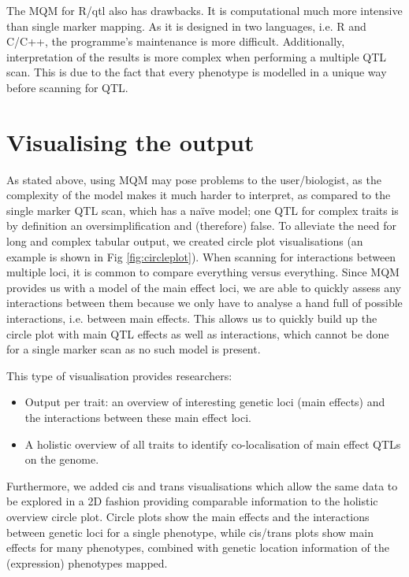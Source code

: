 The MQM for R/qtl also has drawbacks. It is computational much more intensive than single marker mapping. As it is designed in two languages, i.e. 
R and C/C++, the programme's maintenance is more difficult. Additionally, interpretation of the results is more complex when performing a multiple 
QTL scan. This is due to the fact that every phenotype is modelled in a unique way before scanning for QTL. 

\section{Visualising the output}
As stated above, using MQM may pose problems to the user/biologist, as the complexity of the model makes it much harder to interpret, as compared to 
the single marker QTL scan, which has a na\"ive model; one QTL for complex traits is by definition an oversimplification and (therefore) false. To 
alleviate the need for long and complex tabular output, we created circle plot visualisations (an example is shown in Fig \ref{fig:circleplot}). When 
scanning for interactions between multiple loci, it is common to compare everything versus everything. Since MQM provides us with a model of the main 
effect loci, we are able to quickly assess any interactions between them because we only have to analyse a hand full of possible interactions, i.e. 
between main effects. This allows us to quickly build up the circle plot with main QTL effects as well as interactions, which cannot be done for a 
single marker scan as no such model is present. 

This type of visualisation provides researchers:

\begin{itemize}\itemsep1pt
\item Output per trait: an overview of interesting genetic loci (main effects) and the interactions between these main effect loci.
\item A holistic overview of all traits to identify co-localisation of main effect QTLs on the genome.
\end{itemize}

Furthermore, we added cis and trans visualisations which allow the same data to be explored in a 2D fashion providing comparable information to the 
holistic overview circle plot. Circle plots show the main effects and the interactions between genetic loci for a single phenotype, while cis/trans 
plots show main effects for many phenotypes, combined with genetic location information of the (expression) phenotypes mapped. 

